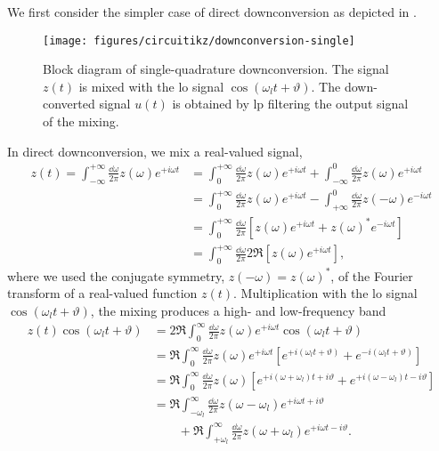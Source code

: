 We first consider the simpler case of direct downconversion as depicted in .
\begin{figure}[htb]
	\centering
	\texttt{[image: figures/circuitikz/downconversion-single]}
	\caption{Block diagram of single-quadrature downconversion. The signal $z(t)$ is mixed with the \gls{lo} signal $\cos(\omega_lt+\vartheta)$. The down-converted signal $u(t)$ is obtained by \gls{lp} filtering the output signal of the mixing.}\label{fig:downconversion_single}
\end{figure}
In direct downconversion, we mix a real-valued signal,
\begin{equation}
	\begin{split}
		z(t)
		=
		\int_{-\infty}^{+\infty}\frac{\dd{\omega}}{2\pi}
		z(\omega)
		e^{+i\omega t}
		&=
		\int_0^{+\infty}\frac{\dd{\omega}}{2\pi}
		z(\omega)
		e^{+i\omega t}
		+
		\int_{-\infty}^0\frac{\dd{\omega}}{2\pi}
		z(\omega)
		e^{+i\omega t}
		\\
		&=
		\int_0^{+\infty}\frac{\dd{\omega}}{2\pi}
		z(\omega)
		e^{+i\omega t}
		-
		\int_{+\infty}^0\frac{\dd{\omega}}{2\pi}
		z(-\omega)
		e^{-i\omega t}
		\\
		&=
		\int_0^{+\infty}\frac{\dd{\omega}}{2\pi}
		\left[
			z(\omega)
			e^{+i\omega t}
			+
			z(\omega)^*
			e^{-i\omega t}
		\right]
		\\
		&=
		\int_0^{+\infty}\frac{\dd{\omega}}{2\pi}
		2\Re\left[
			z(\omega)
			e^{+i\omega t}
		\right]
		,
	\end{split}
\end{equation}
where we used the conjugate symmetry, $z(-\omega)=z(\omega)^*$, of the Fourier transform of a real-valued function $z(t)$.
Multiplication with the \gls{lo} signal $\cos(\omega_lt+\vartheta)$, the mixing produces a high- and low-frequency band
\begin{equation}
	\begin{split}
		z(t)
		\cos(\omega_lt+\vartheta)
		&=
		2\Re
		\int_0^\infty\frac{\dd{\omega}}{2\pi}
		z(\omega)
		e^{+i\omega t}
		\cos(\omega_lt+\vartheta)
		\\
		&=
		\Re
		\int_0^\infty\frac{\dd{\omega}}{2\pi}
		z(\omega)
		e^{+i\omega t}
		\left[
			e^{+i(\omega_lt+\vartheta)}
			+
			e^{-i(\omega_lt+\vartheta)}
		\right]
		\\
		&=
		\Re
		\int_0^\infty\frac{\dd{\omega}}{2\pi}
		z(\omega)
		\left[
			e^{+i(\omega+\omega_l)t+i\vartheta}
			+
			e^{+i(\omega-\omega_l)t-i\vartheta}
		\right]
		\\
		&=
		\Re
		\int_{-\omega_l}^\infty\frac{\dd{\omega}}{2\pi}
		z(\omega-\omega_l)
		e^{+i\omega t+i\vartheta}
		\\
		&\qquad+
		\Re
		\int_{+\omega_l}^\infty\frac{\dd{\omega}}{2\pi}
		z(\omega+\omega_l)
		e^{+i\omega t-i\vartheta}
		.
	\end{split}
\end{equation}
